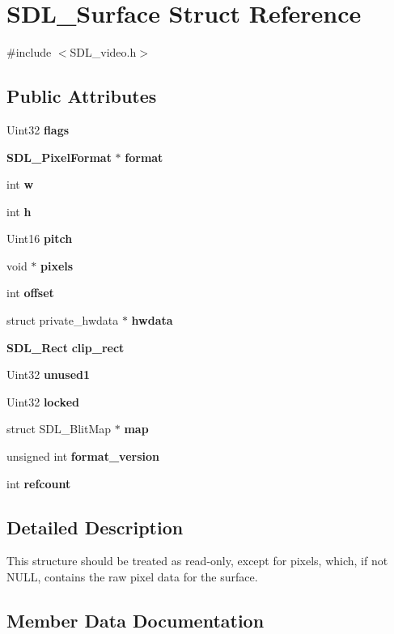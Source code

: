 \section{S\+D\+L\+\_\+\+Surface Struct Reference}
\label{struct_s_d_l___surface}


{\ttfamily \#include $<$S\+D\+L\+\_\+video.\+h$>$}

\subsection*{Public Attributes}
\begin{DoxyCompactItemize}
\item 
Uint32 {\bf flags}
\item 
{\bf S\+D\+L\+\_\+\+Pixel\+Format} $\ast$ {\bf format}
\item 
int {\bfseries w}\label{struct_s_d_l___surface_a9b0ec7185dcdb2a3530a9160a6ea83d9}

\item 
int {\bf h}
\item 
Uint16 {\bf pitch}
\item 
void $\ast$ {\bf pixels}
\item 
int {\bf offset}
\item 
struct private\+\_\+hwdata $\ast$ {\bf hwdata}
\item 
{\bf S\+D\+L\+\_\+\+Rect} {\bf clip\+\_\+rect}
\item 
Uint32 {\bf unused1}
\item 
Uint32 {\bf locked}
\item 
struct S\+D\+L\+\_\+\+Blit\+Map $\ast$ {\bf map}
\item 
unsigned int {\bf format\+\_\+version}
\item 
int {\bf refcount}
\end{DoxyCompactItemize}


\subsection{Detailed Description}
This structure should be treated as read-\/only, except for \textquotesingle{}pixels\textquotesingle{}, which, if not N\+U\+L\+L, contains the raw pixel data for the surface. 

\subsection{Member Data Documentation}
